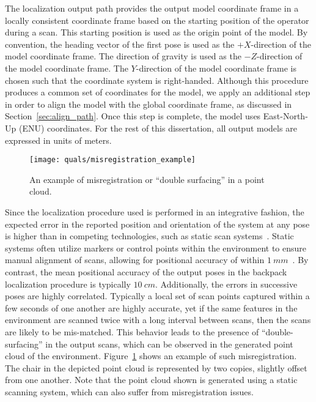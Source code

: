 \documentclass[12pt,onecolumn,oneside]{book}
\begin{document}
The localization output path provides the output model coordinate frame in a locally consistent coordinate frame based on the starting position of the operator during a scan.  This starting position is used as the origin point of the model.  By convention, the heading vector of the first pose is used as the $+X$-direction of the model coordinate frame.  The direction of gravity is used as the $-Z$-direction of the model coordinate frame.  The $Y$-direction of the model coordinate frame is chosen such that the coordinate system is right-handed.  Although this procedure produces a common set of coordinates for the model, we apply an additional step in order to align the model with the global coordinate frame, as discussed in Section~\ref{sec:align_path}.  Once this step is complete, the model uses East-North-Up (ENU) coordinates.  For the rest of this dissertation, all output models are expressed in units of meters.

\begin{figure}
	\centerline{\texttt{[image: quals/misregistration\_example]}}
	\caption{An example of misregistration or ``double surfacing'' in a point cloud.}
	\label{fig:double_surface}
\end{figure}

Since the localization procedure used is performed in an integrative fashion, the expected error in the reported position and orientation of the system at any pose is higher than in competing technologies, such as static scan systems~\cite{NickJournal}.  Static systems often utilize markers or control points within the environment to ensure manual alignment of scans, allowing for positional accuracy of within $1~mm$~\cite{Li97,Karimi00}.  By contrast, the mean positional accuracy of the output poses in the backpack localization procedure is typically $10~cm$.  Additionally, the errors in successive poses are highly correlated.  Typically a local set of scan points captured within a few seconds of one another are highly accurate, yet if the same features in the environment are scanned twice with a long interval between scans, then the scans are likely to be mis-matched.  This behavior leads to the presence of ``double-surfacing'' in the output scans, which can be observed in the generated point cloud of the environment.  Figure~\ref{fig:double_surface} shows an example of such misregistration.  The chair in the depicted point cloud is represented by two copies, slightly offset from one another.  Note that the point cloud shown is generated using a static scanning system, which can also suffer from misregistration issues.
\end{document}
